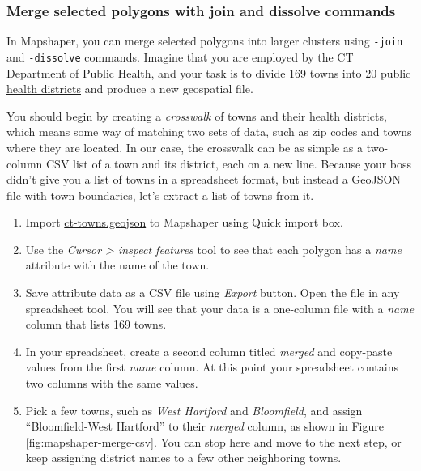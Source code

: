 \documentclass[
  english,
]{book}
\begin{document}
\hypertarget{merge-selected-polygons-with-join-and-dissolve-commands}{%
\subsubsection*{Merge selected polygons with join and dissolve commands}\label{merge-selected-polygons-with-join-and-dissolve-commands}}

In Mapshaper, you can merge selected polygons into larger clusters using \texttt{-join} and \texttt{-dissolve} commands. Imagine that you are employed by the CT Department of Public Health, and your task is to divide 169 towns into 20 \href{https://portal.ct.gov/DPH/Local-Health-Admin/LHA/Local-Health-Administration---Site-Map}{public health districts} and produce a new geospatial file.

You should begin by creating a \emph{crosswalk} of towns and their health districts, which means some way of matching two sets of data, such as zip codes and towns where they are located. In our case, the crosswalk can be as simple as a two-column CSV list
of a town and its district, each on a new line. Because your boss didn't give you a list of towns in a spreadsheet format,
but instead a GeoJSON file with town boundaries, let's extract a list of towns from it.

\begin{enumerate}
\def\labelenumi{\arabic{enumi}.}
\item
  Import \href{data/ct-towns.geojson}{ct-towns.geojson} to Mapshaper using Quick import box.
\item
  Use the \emph{Cursor \textgreater{} inspect features} tool to see that each polygon has a \emph{name} attribute with the name of the town.
\item
  Save attribute data as a CSV file using \emph{Export} button. Open the file in any spreadsheet tool. You will see that your data is a one-column
  file with a \emph{name} column that lists 169 towns.
\item
  In your spreadsheet, create a second column titled \emph{merged} and copy-paste values from the first \emph{name} column. At this point your spreadsheet contains two columns with the same values.
\item
  Pick a few towns, such as \emph{West Hartford} and \emph{Bloomfield}, and assign ``Bloomfield-West Hartford''
  to their \emph{merged} column, as shown in Figure \ref{fig:mapshaper-merge-csv}. You can stop here and move to the next step, or keep assigning district names to a few other neighboring towns.
\end{enumerate}
\end{document}
